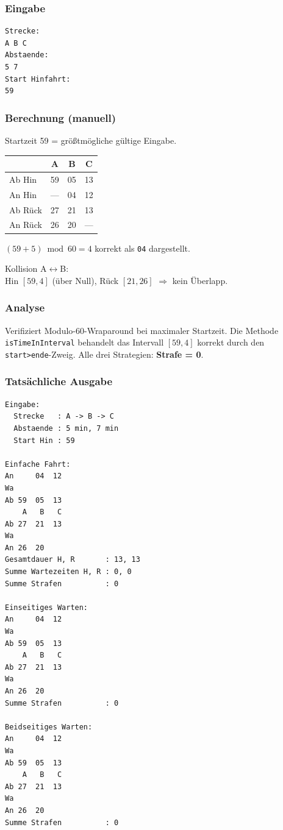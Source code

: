 \documentclass[12pt,a4paper]{article}
\begin{document}
\noindent
\begin{minipage}[t]{0.48\textwidth}
\scriptsize
\setlength{\tabcolsep}{2pt}

\subsubsection*{Eingabe}
\begin{lstlisting}
Strecke:
A B C
Abstaende:
5 7
Start Hinfahrt:
59
\end{lstlisting}

\subsubsection*{Berechnung (manuell)}
Startzeit 59 = größtmögliche gültige Eingabe.\\[2pt]
\begin{tabular}{l|ccc}
\toprule
 & \textbf{A} & \textbf{B} & \textbf{C}\\
\midrule
Ab Hin  & 59 & 05 & 13\\
An Hin  & —  & 04 & 12\\
Ab Rück & 27 & 21 & 13\\
An Rück & 26 & 20 & —\\
\bottomrule
\end{tabular}

\vspace{4pt}
$(59+5)\bmod 60 = 4$ korrekt als \texttt{04} dargestellt.

\vspace{4pt}
Kollision A$\leftrightarrow$B:\\
Hin $[59,4]$ (über Null), Rück $[21,26]$ $\Rightarrow$ kein Überlapp.

\subsubsection*{Analyse}
Verifiziert Modulo-60-Wraparound bei maximaler Startzeit.
Die Methode \texttt{isTimeInInterval} behandelt das Intervall $[59,4]$
korrekt durch den \texttt{start>ende}-Zweig.
Alle drei Strategien: \textbf{Strafe = 0}.
\end{minipage}
\hfill
\begin{minipage}[t]{0.48\textwidth}
\scriptsize
\subsubsection*{Tatsächliche Ausgabe}
\begin{lstlisting}
Eingabe:
  Strecke   : A -> B -> C
  Abstaende : 5 min, 7 min
  Start Hin : 59

Einfache Fahrt:
An     04  12
Wa
Ab 59  05  13
    A   B   C
Ab 27  21  13
Wa
An 26  20
Gesamtdauer H, R       : 13, 13
Summe Wartezeiten H, R : 0, 0
Summe Strafen          : 0

Einseitiges Warten:
An     04  12
Wa
Ab 59  05  13
    A   B   C
Ab 27  21  13
Wa
An 26  20
Summe Strafen          : 0

Beidseitiges Warten:
An     04  12
Wa
Ab 59  05  13
    A   B   C
Ab 27  21  13
Wa
An 26  20
Summe Strafen          : 0
\end{lstlisting}
\end{minipage}
\end{document}
